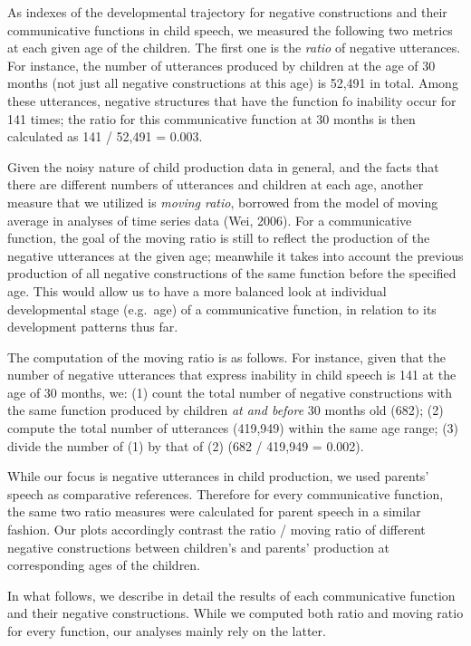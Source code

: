 \documentclass[10pt, letterpaper]{article}
\begin{document}
As indexes of the developmental trajectory for negative constructions
and their communicative functions in child speech, we measured the
following two metrics at each given age of the children. The first one
is the \emph{ratio} of negative utterances. For instance, the number of
utterances produced by children at the age of 30 months (not just all
negative constructions at this age) is 52,491 in total. Among these
utterances, negative structures that have the function fo inability
occur for 141 times; the ratio for this communicative function at 30
months is then calculated as 141 / 52,491 = 0.003.

Given the noisy nature of child production data in general, and the
facts that there are different numbers of utterances and children at
each age, another measure that we utilized is \emph{moving ratio},
borrowed from the model of moving average in analyses of time series
data (Wei, 2006). For a communicative function, the goal of the moving
ratio is still to reflect the production of the negative utterances at
the given age; meanwhile it takes into account the previous production
of all negative constructions of the same function before the specified
age. This would allow us to have a more balanced look at individual
developmental stage (e.g.~age) of a communicative function, in relation
to its development patterns thus far.

The computation of the moving ratio is as follows. For instance, given
that the number of negative utterances that express inability in child
speech is 141 at the age of 30 months, we: (1) count the total number of
negative constructions with the same function produced by children
\emph{at and before} 30 months old (682); (2) compute the total number
of utterances (419,949) within the same age range; (3) divide the number
of (1) by that of (2) (682 / 419,949 = 0.002).

While our focus is negative utterances in child production, we used
parents' speech as comparative references. Therefore for every
communicative function, the same two ratio measures were calculated for
parent speech in a similar fashion. Our plots accordingly contrast the
ratio / moving ratio of different negative constructions between
children's and parents' production at corresponding ages of the
children.

In what follows, we describe in detail the results of each communicative
function and their negative constructions. While we computed both ratio
and moving ratio for every function, our analyses mainly rely on the
latter.
\end{document}
